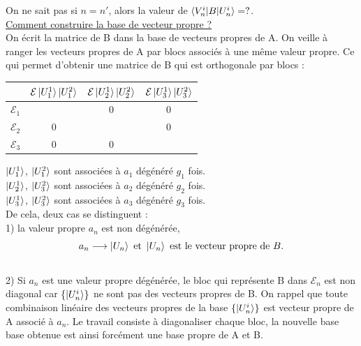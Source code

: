 \documentclass[12pt,a4paper,titlepage]{book}
\begin{document}
On ne sait pas si $n = n'$, alors la valeur de $\braket{V_n^i | B | U_n^i} = ?$.\\

\underline{Comment construire la base de vecteur propre ?}\\

On écrit la matrice de B dans la base de vecteurs propres de A. On veille à ranger les vecteurs propres de A par blocs associés à une même valeur propre. Ce qui permet d'obtenir une matrice de B qui est orthogonale par blocs :\\

\begin{table}[h!]
\begin{center}
\label{tab:tableau 1}
\begin{tabular}{c|c|c|c}
 & $\mathcal{E} \ket{U_1^1} \ket{U_1^2}$ & $\mathcal{E} \ket{U_2^1} \ket{U_2^2}$ & $\mathcal{E} \ket{U_3^1} \ket{U_3^2}$\\
 \hline
$\mathcal{E}_1$ & & 0 & 0\\
\hline
$\mathcal{E}_2$ & 0 & & 0\\
\hline
$\mathcal{E}_3$ & 0 & 0 & \\
\end{tabular}
\end{center}
\end{table}
$\ket{U_1^1}$, $\ket{U_1^2}$ sont associées à $a_1$ dégénéré $g_1$ fois.\\
$\ket{U_2^1}$, $\ket{U_3^2}$ sont associées à $a_2$ dégénéré $g_2$ fois.\\
$\ket{U_3^1}$, $\ket{U_3^2}$ sont associées à $a_3$ dégénéré $g_3$ fois.\\

De cela, deux cas se distinguent :\\
1) la valeur propre $a_n$ est non dégénérée,
\begin{equation*}
a_n \longrightarrow \ket{U_n} ~\text{et}~ \ket{U_n} \text{ est le vecteur propre de }B.
\end{equation*}\\
2) Si $a_n$ est une valeur propre dégénérée, le bloc qui représente B dans $\mathcal{E}_n$ est non diagonal car $\lbrace \ket{U_n^i} \rbrace$ ne sont pas des vecteurs propres de B. On rappel que toute combinaison linéaire des vecteurs propres de la base $\lbrace \ket{U_n^i} \rbrace$ est vecteur propre de A associé à $a_n$. Le travail consiste à diagonaliser chaque bloc, la nouvelle base base obtenue est ainsi forcément une base propre de A et B.
\end{document}
